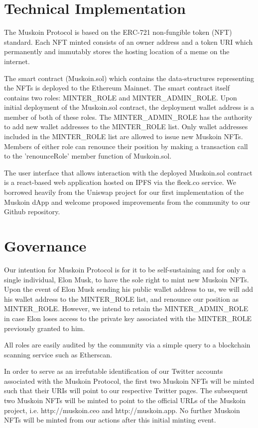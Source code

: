 \documentclass{article}
\begin{document}
\section{Technical Implementation}
The Muskoin Protocol is based on the ERC-721 non-fungible token (NFT) standard. Each NFT minted consists of an owner address and a token URI which permanently and immutably stores the hosting location of a meme on the internet. 

The smart contract (Muskoin.sol) which contains the data-structures representing the NFTs is deployed to the Ethereum Mainnet. The smart contract itself contains two roles: MINTER\_ROLE and MINTER\_ADMIN\_ROLE. Upon initial deployment of the Muskoin.sol contract, the deployment wallet address is a member of both of these roles. The MINTER\_ADMIN\_ROLE has the authority to add new wallet addresses to the MINTER\_ROLE list. Only wallet addresses included in the MINTER\_ROLE list are allowed to issue new Muskoin NFTs. Members of either role can renounce their position by making a transaction call to the 'renounceRole' member function of Muskoin.sol. 

The user interface that allows interaction with the deployed Muskoin.sol contract is a react-based web application hosted on IPFS via the fleek.co service. We borrowed heavily from the Uniswap project for our first implementation of the Muskoin dApp and welcome proposed improvements from the community to our Github repository. 

\section{Governance}

Our intention for Muskoin Protocol is for it to be self-sustaining and for only a single individual, Elon Musk, to have the sole right to mint new Muskoin NFTs. Upon the event of Elon Musk sending his public wallet address to us, we will add his wallet address to the MINTER\_ROLE list, and renounce our position as MINTER\_ROLE. However, we intend to retain the MINTER\_ADMIN\_ROLE in case Elon loses access to the private key associated with the MINTER\_ROLE previously granted to him. 

All roles are easily audited by the community via a simple query to a blockchain scanning service such as Etherscan.

In order to serve as an irrefutable identification of our Twitter accounts associated with the Muskoin Protocol, the first two Muskoin NFTs will be minted such that their URIs will point to our respective Twitter pages. The subsequent two Muskoin NFTs will be minted to point to the official URLs of the Muskoin project, i.e. http://muskoin.ceo and http://muskoin.app. No further Muskoin NFTs will be minted from our actions after this initial minting event. 
\end{document}
